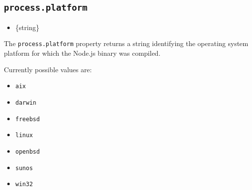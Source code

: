 \subsection{\texorpdfstring{\texttt{process.platform}}{process.platform}}\label{process.platform}

\begin{itemize}
\tightlist
\item
  \{string\}
\end{itemize}

The \texttt{process.platform} property returns a string identifying the
operating system platform for which the Node.js binary was compiled.

Currently possible values are:

\begin{itemize}
\tightlist
\item
  \texttt{\textquotesingle{}aix\textquotesingle{}}
\item
  \texttt{\textquotesingle{}darwin\textquotesingle{}}
\item
  \texttt{\textquotesingle{}freebsd\textquotesingle{}}
\item
  \texttt{\textquotesingle{}linux\textquotesingle{}}
\item
  \texttt{\textquotesingle{}openbsd\textquotesingle{}}
\item
  \texttt{\textquotesingle{}sunos\textquotesingle{}}
\item
  \texttt{\textquotesingle{}win32\textquotesingle{}}
\end{itemize}

\begin{Shaded}
\begin{Highlighting}[]
 \OperatorTok{;}

\NormalTok{(}\SpecialCharTok{$\{}\SpecialCharTok{\}}\VerbatimStringTok{\textasciigrave{}}\NormalTok{)}\OperatorTok{;}
\end{Highlighting}
\end{Shaded}

\begin{Shaded}
\begin{Highlighting}[]
\OperatorTok{=} \NormalTok{(}\NormalTok{)}\OperatorTok{;}

\NormalTok{(}\SpecialCharTok{$\{}\SpecialCharTok{\}}\VerbatimStringTok{\textasciigrave{}}\NormalTok{)}\OperatorTok{;}
\end{Highlighting}
\end{Shaded}

